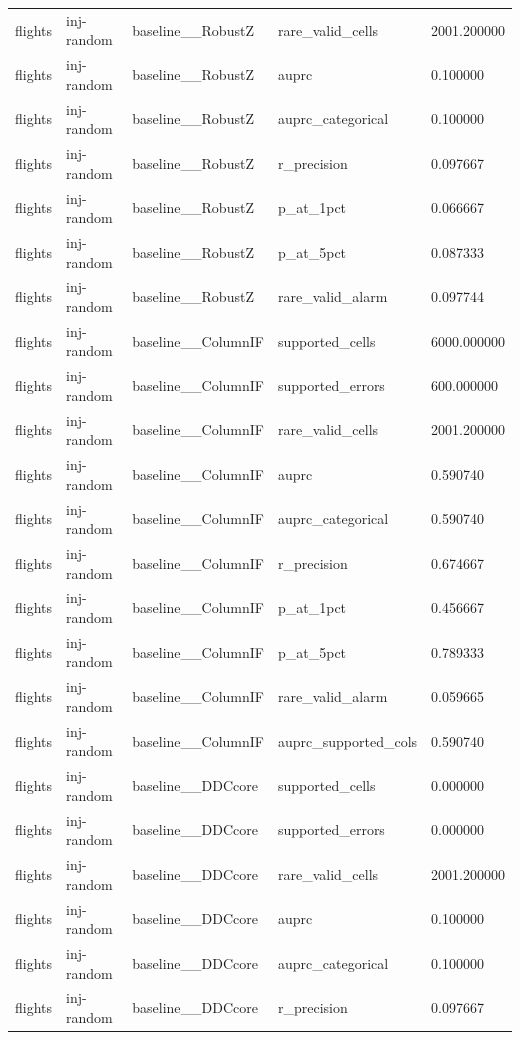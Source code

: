 \begin{tabular}{lllll}
flights & inj-random & baseline\_\_RobustZ & rare\_valid\_cells & 2001.200000 \\
flights & inj-random & baseline\_\_RobustZ & auprc & 0.100000 \\
flights & inj-random & baseline\_\_RobustZ & auprc\_categorical & 0.100000 \\
flights & inj-random & baseline\_\_RobustZ & r\_precision & 0.097667 \\
flights & inj-random & baseline\_\_RobustZ & p\_at\_1pct & 0.066667 \\
flights & inj-random & baseline\_\_RobustZ & p\_at\_5pct & 0.087333 \\
flights & inj-random & baseline\_\_RobustZ & rare\_valid\_alarm & 0.097744 \\
flights & inj-random & baseline\_\_ColumnIF & supported\_cells & 6000.000000 \\
flights & inj-random & baseline\_\_ColumnIF & supported\_errors & 600.000000 \\
flights & inj-random & baseline\_\_ColumnIF & rare\_valid\_cells & 2001.200000 \\
flights & inj-random & baseline\_\_ColumnIF & auprc & 0.590740 \\
flights & inj-random & baseline\_\_ColumnIF & auprc\_categorical & 0.590740 \\
flights & inj-random & baseline\_\_ColumnIF & r\_precision & 0.674667 \\
flights & inj-random & baseline\_\_ColumnIF & p\_at\_1pct & 0.456667 \\
flights & inj-random & baseline\_\_ColumnIF & p\_at\_5pct & 0.789333 \\
flights & inj-random & baseline\_\_ColumnIF & rare\_valid\_alarm & 0.059665 \\
flights & inj-random & baseline\_\_ColumnIF & auprc\_supported\_cols & 0.590740 \\
flights & inj-random & baseline\_\_DDCcore & supported\_cells & 0.000000 \\
flights & inj-random & baseline\_\_DDCcore & supported\_errors & 0.000000 \\
flights & inj-random & baseline\_\_DDCcore & rare\_valid\_cells & 2001.200000 \\
flights & inj-random & baseline\_\_DDCcore & auprc & 0.100000 \\
flights & inj-random & baseline\_\_DDCcore & auprc\_categorical & 0.100000 \\
flights & inj-random & baseline\_\_DDCcore & r\_precision & 0.097667 \\

\end{tabular}
